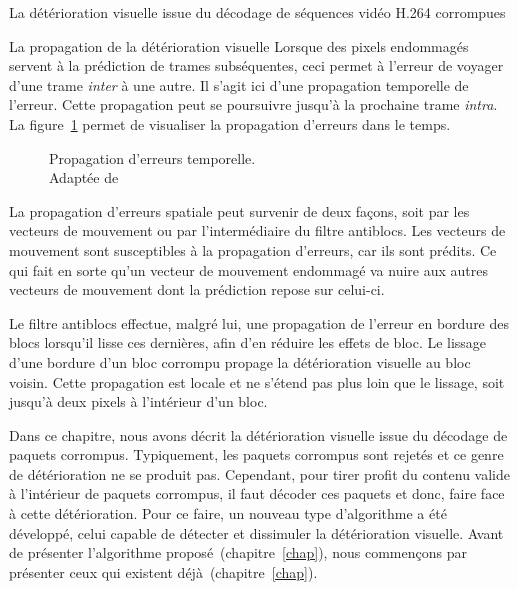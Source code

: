 \documentclass[letterpaper, twoside, 12pt,memoire]{thETS}
\newcommand{\fig}[1]{figure~\ref{#1}}
\newcommand{\LT}[1]{%
	{
	\todo[inline,color={red!33!green!33!blue!33}]{%
	\textbf{[LT]:}~#1}
	}}
\begin{document}
\begin{chapter}{La détérioration visuelle issue du décodage de séquences vidéo
H.264 corrompues}
\begin{section}{La propagation de la détérioration visuelle}
Lorsque des pixels endommagés servent à la prédiction de trames subséquentes,
ceci permet à l'erreur de voyager d'une trame \textit{inter} à une autre. Il
s'agit ici d'une propagation temporelle de l'erreur. Cette propagation peut se
poursuivre jusqu'à la prochaine trame \textit{intra}. La \fig{fig-ErrorProp}
permet de visualiser la propagation d'erreurs dans le temps.

\begin{figure}[htb]
\centering
{}
\caption{Propagation d'erreurs temporelle.\\
Adaptée de \citet[p.~1711]{Giro1999}}
\label{fig-ErrorProp}
\end{figure}

La propagation d'erreurs spatiale peut survenir de deux façons, soit par les
vecteurs de mouvement ou par l'intermédiaire du filtre antiblocs. Les
vecteurs de mouvement sont susceptibles à la propagation d'erreurs, car ils sont
prédits. Ce qui fait en sorte qu'un vecteur de mouvement endommagé va nuire aux
autres vecteurs de mouvement dont la prédiction repose sur celui-ci.

Le filtre antiblocs effectue, malgré lui, une propagation de l'erreur en bordure
des blocs lorsqu'il lisse ces dernières, afin d'en réduire les effets de bloc.
Le lissage d'une bordure d'un bloc corrompu propage la détérioration visuelle au
bloc voisin. Cette propagation est locale et ne s'étend pas plus loin que le
lissage, soit jusqu'à deux pixels à l'intérieur d'un bloc.
\end{section}

Dans ce chapitre, nous avons décrit la détérioration visuelle issue du décodage
de paquets corrompus. Typiquement, les paquets corrompus sont rejetés et ce
genre de détérioration ne se produit pas. Cependant, pour tirer profit du
contenu valide à l'intérieur de paquets corrompus, il faut décoder ces paquets
et donc, faire face à cette détérioration. Pour ce faire, un nouveau type
d'algorithme a été développé, celui capable de détecter et dissimuler la
détérioration visuelle. Avant de présenter l'algorithme
proposé~(chapitre~\ref{chap}), nous commençons par présenter ceux qui existent
déjà~(chapitre~\ref{chap}).

\LT{Faire les lien avec les chapitre}

\end{chapter}



\end{document}
